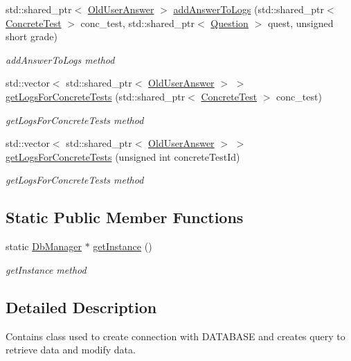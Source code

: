 \begin{DoxyCompactItemize}
std\+::shared\+\_\+ptr$<$ \hyperlink{class_old_user_answer}{Old\+User\+Answer} $>$ \hyperlink{class_db_manager_a055df452020e3af56d84cbec0a42baf9}{add\+Answer\+To\+Logs} (std\+::shared\+\_\+ptr$<$ \hyperlink{class_concrete_test}{Concrete\+Test} $>$ conc\+\_\+test, std\+::shared\+\_\+ptr$<$ \hyperlink{class_question}{Question} $>$ quest, unsigned short grade)
\begin{DoxyCompactList}\small\item\em add\+Answer\+To\+Logs method \end{DoxyCompactList}\item 
std\+::vector$<$ std\+::shared\+\_\+ptr$<$ \hyperlink{class_old_user_answer}{Old\+User\+Answer} $>$ $>$ \hyperlink{class_db_manager_a491adbd809f1a74913f4eb1b6e4497c9}{get\+Logs\+For\+Concrete\+Tests} (std\+::shared\+\_\+ptr$<$ \hyperlink{class_concrete_test}{Concrete\+Test} $>$ conc\+\_\+test)
\begin{DoxyCompactList}\small\item\em get\+Logs\+For\+Concrete\+Tests method \end{DoxyCompactList}\item 
std\+::vector$<$ std\+::shared\+\_\+ptr$<$ \hyperlink{class_old_user_answer}{Old\+User\+Answer} $>$ $>$ \hyperlink{class_db_manager_af14965b28cc78d80bbf76bddf045e13c}{get\+Logs\+For\+Concrete\+Tests} (unsigned int concrete\+Test\+Id)
\begin{DoxyCompactList}\small\item\em get\+Logs\+For\+Concrete\+Tests method \end{DoxyCompactList}\end{DoxyCompactItemize}
\subsection*{Static Public Member Functions}
\begin{DoxyCompactItemize}
\item 
static \hyperlink{class_db_manager}{Db\+Manager} $\ast$ \hyperlink{class_db_manager_ab7a78daf74a668a26c4403a8c43ede3f}{get\+Instance} ()
\begin{DoxyCompactList}\small\item\em get\+Instance method \end{DoxyCompactList}\end{DoxyCompactItemize}


\subsection{Detailed Description}
Contains class used to create connection with D\+A\+T\+A\+B\+A\+SE and creates query to retrieve data and modify data. 

